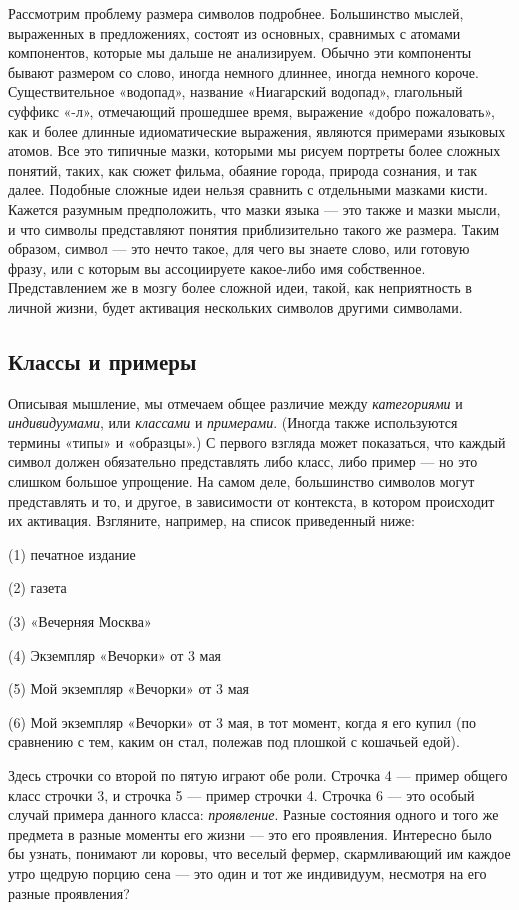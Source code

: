 \documentclass[../main.tex]{subfiles}
\begin{document}
Рассмотрим проблему размера символов подробнее. Большинство мыслей, выраженных в предложениях, состоят из основных, сравнимых с атомами компонентов, которые мы дальше не анализируем. Обычно эти компоненты бывают размером со слово, иногда немного длиннее, иногда немного короче. Существительное «водопад», название «Ниагарский водопад», глагольный суффикс «-л», отмечающий прошедшее время, выражение «добро пожаловать», как и более длинные идиоматические выражения, являются примерами языковых атомов. Все это типичные мазки, которыми мы рисуем портреты более сложных понятий, таких, как сюжет фильма, обаяние города, природа сознания, и так далее. Подобные сложные идеи нельзя сравнить с отдельными мазками кисти. Кажется разумным предположить, что мазки языка --- это также и мазки мысли, и что символы представляют понятия приблизительно такого же размера. Таким образом, символ --- это нечто такое, для чего вы знаете слово, или готовую фразу, или с которым вы ассоциируете какое-либо имя собственное. Представлением же в мозгу более сложной идеи, такой, как неприятность в личной жизни, будет активация нескольких символов другими символами.

\subsection{Классы и примеры}

Описывая мышление, мы отмечаем общее различие между \emph{категориями} и \emph{индивидуумами}, или \emph{классами} и \emph{примерами}. (Иногда также используются термины «типы» и «образцы».) С первого взгляда может показаться, что каждый символ должен обязательно представлять либо класс, либо пример --- но это слишком большое упрощение. На самом деле, большинство символов могут представлять и то, и другое, в зависимости от контекста, в котором происходит их активация. Взгляните, например, на список приведенный ниже:

(1) печатное издание

(2) газета

(3) «Вечерняя Москва»

(4) Экземпляр «Вечорки» от 3 мая

(5) Мой экземпляр «Вечорки» от 3 мая

(6) Мой экземпляр «Вечорки» от 3 мая, в тот момент, когда я его купил (по сравнению с тем, каким он стал, полежав под плошкой с кошачьей едой).

Здесь строчки со второй по пятую играют обе роли. Строчка 4 --- пример общего класс строчки 3, и строчка 5 --- пример строчки 4. Строчка 6 --- это особый случай примера данного класса: \emph{проявление}. Разные состояния одного и того же предмета в разные моменты его жизни --- это его проявления. Интересно было бы узнать, понимают ли коровы, что веселый фермер, скармливающий им каждое утро щедрую порцию сена --- это один и тот же индивидуум, несмотря на его разные проявления?
\end{document}
